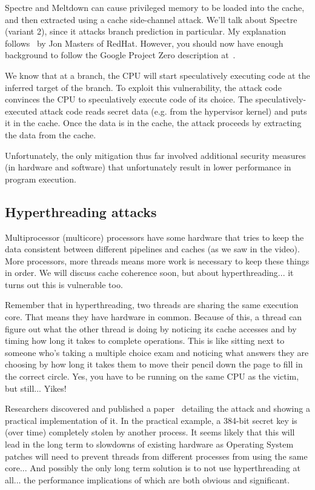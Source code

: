 \documentclass[a4paper]{report}
\begin{document}
Spectre and Meltdown can cause privileged memory to be loaded into the cache, and then extracted using a cache side-channel attack. We'll talk about Spectre (variant 2), since it attacks branch prediction in particular. My explanation follows~\cite{masters18:_what_meltd_spect} by Jon Masters of RedHat. However, you should now have enough background to follow the Google Project Zero description at~\cite{horn18:_readin}.

We know that at a branch, the CPU will start speculatively executing code at the inferred target of the branch. To exploit this vulnerability, the attack code convinces the CPU to speculatively execute code of its choice. The speculatively-executed attack code reads secret data (e.g. from the hypervisor kernel) and puts it in the cache. Once the data is in the cache, the attack proceeds by extracting the data from the cache.

Unfortunately, the only mitigation thus far involved additional security measures (in hardware and software) that unfortunately result in lower performance in program execution.

\subsection*{Hyperthreading attacks}
Multiprocessor (multicore) processors have some hardware that tries to keep the data consistent between different pipelines and caches (as we saw in the video). More processors, more threads means more work is necessary to keep these things in order. We will discuss cache coherence soon, but about hyperthreading... it turns out this is vulnerable too.

Remember that in hyperthreading, two threads are sharing the same execution core. That means they have hardware in common. Because of this, a thread can figure out what the other thread is doing by noticing its cache accesses and by timing how long it takes to complete operations. This is like sitting next to someone who's taking a multiple choice exam and noticing what answers they are choosing by how long it takes them to move their pencil down the page to fill in the correct circle. Yes, you have to be running on the same CPU as the victim, but still... Yikes! 

Researchers discovered and published a paper~\cite{portsmash} detailing the attack and showing a practical implementation of it. In the practical example, a 384-bit secret key is (over time) completely stolen by another process. It seems likely that this will lead in the long term to slowdowns of existing hardware as Operating System patches will need to prevent threads from different processes from using the same core... And possibly the only long term solution is to not use hyperthreading at all... the performance implications of which are both obvious and significant.
\end{document}
